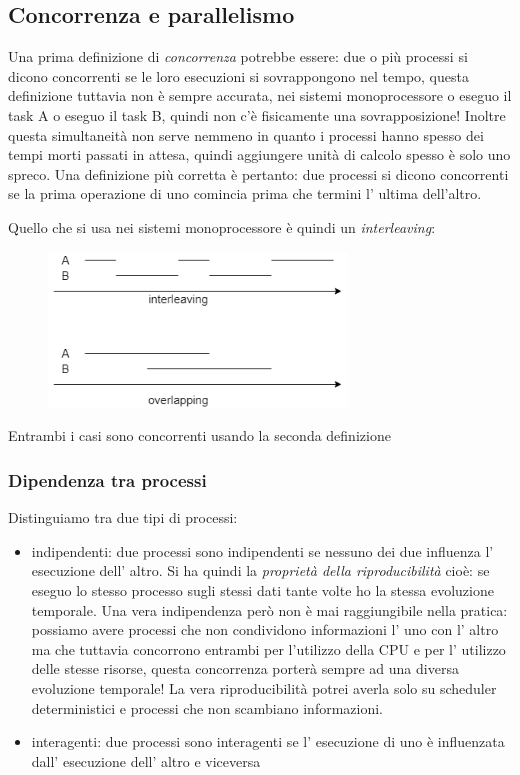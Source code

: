 \subsection{Concorrenza e parallelismo}
Una prima definizione di \emph{concorrenza} potrebbe essere: due o più processi si dicono concorrenti se le loro esecuzioni si sovrappongono nel tempo, questa definizione tuttavia non è sempre accurata, nei sistemi monoprocessore o eseguo il task A o eseguo il task B, quindi non c'è fisicamente una sovrapposizione!
Inoltre questa simultaneità non serve nemmeno in quanto i processi hanno spesso dei tempi morti passati in attesa, quindi aggiungere unità di calcolo spesso è solo uno spreco.
Una definizione più corretta è pertanto: due processi si dicono concorrenti se la prima operazione di uno comincia prima che termini l' ultima dell'altro.

Quello che si usa nei sistemi monoprocessore è quindi un \emph{interleaving}:
\begin{figure}[H]
    \centering
    \includegraphics[width=300px]{images/3_Gestione_dei_processi/interleaving.png}
\end{figure}
Entrambi i casi sono concorrenti usando la seconda definizione

\subsubsection{Dipendenza tra processi}
Distinguiamo tra due tipi di processi:
\begin{itemize}
    \item indipendenti: due processi sono indipendenti se nessuno dei due influenza l' esecuzione dell' altro.
    Si ha quindi la \emph{proprietà della riproducibilità} cioè: se eseguo lo stesso processo sugli stessi dati tante volte ho la stessa evoluzione temporale.
    Una vera indipendenza però non è mai raggiungibile nella pratica: possiamo avere processi che non condividono informazioni l' uno con l' altro ma che tuttavia concorrono entrambi per l'utilizzo della CPU e per l' utilizzo delle stesse risorse, questa concorrenza porterà sempre ad una diversa evoluzione temporale!
    La vera riproducibilità potrei averla solo su scheduler deterministici e processi che non scambiano informazioni.
    
    \item interagenti: due processi sono interagenti se l' esecuzione di uno è influenzata dall' esecuzione dell' altro e viceversa
\end{itemize}

